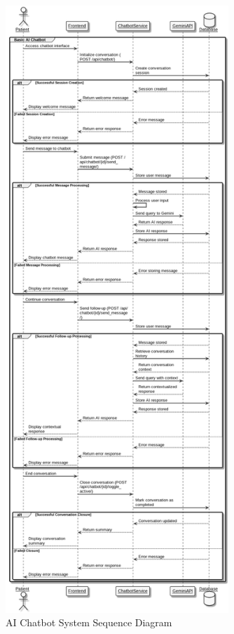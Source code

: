 \begin{figure}[H]
    \centering
    \includegraphics[width=0.75\textwidth]{Chatbot_Sequence_Diagram.png}
    \caption{AI Chatbot System Sequence Diagram}
    \label{fig:chatbot-sequence-diagram}
\end{figure}